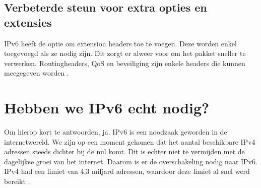 \subsection{Verbeterde steun voor extra opties en extensies}

IPv6 heeft de optie om extension headers toe te voegen. Deze worden enkel toegevoegd als ze nodig zijn. Dit zorgt er alweer voor om het pakket sneller te verwerken. Routingheaders, QoS en beveiliging zijn enkele headers die kunnen meegegeven worden \autocite{Hagen2014}.

\section{Hebben we IPv6 echt nodig?}

Om hierop kort te antwoorden, ja. IPv6 is een noodzaak geworden in de internetwereld. We zijn op een moment gekomen dat het aantal beschikbare IPv4 adressen steeds dichter bij de nul komt. Dit is echter niet te vermijden met de dagelijkse groei van het internet. Daarom is er de overschakeling nodig naar IPv6. IPv4 had een limiet van 4,3 miljard adressen, waardoor deze limiet al snel werd bereikt \autocite{Hagen2014}. 